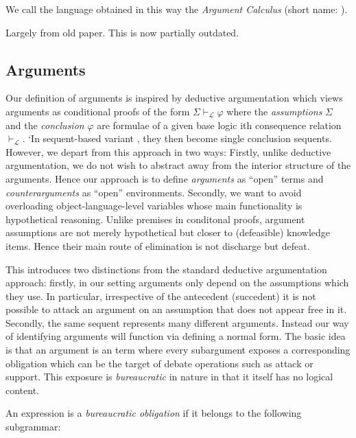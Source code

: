 \documentclass{article}
\begin{document}
We call the language obtained in this way the \emph{Argument Calculus} (short name: \AC).


\begin{oldpart}{Largely from old paper. This is now partially outdated.}

  \subsection{Arguments}

  Our definition of arguments is inspired by deductive argumentation \cite{besnard-review-argum} which views arguments as conditional proofs of the form $\Sigma \vdash_{\mathcal{L}} \varphi$ where the \emph{assumptions} $\Sigma$ and the \emph{conclusion} $\varphi$ are formulae of a given base logic ith consequence relation $\vdash_{\mathcal{L}}$.
  `In sequent-based variant \cite{TODO}, they then become single conclusion sequents.
  However, we depart from this approach in two ways:
  Firstly, unlike deductive argumentation, we do not wish to abstract away from the interior structure of the arguments.
  Hence our approach is to define \emph{arguments} as ``open'' terms and \emph{counterarguments} as ``open'' environments.
  Secondly, we want to avoid overloading object-language-level variables whose main functionality is hypothetical reasoning.
  Unlike premises in conditonal proofs, argument assumptions are not merely hypothetical but closer to (defeasible) knowledge items.
  Hence their main route of elimination is not discharge but defeat.

  This introduces two distinctions from the standard deductive argumentation approach: firstly, in our setting arguments only depend on the assumptions which they use.
  In particular, irrespective of the antecedent (succedent) it is not possible to attack an argument on an assumption that does not appear free in it.
  Secondly, the same sequent represents many different arguments.
  Instead our way of identifying arguments will function via defining a normal form.
  The basic idea is that an argument is an \AC term where every subargument exposes a corresponding obligation which can be the target of debate operations such as attack or support.
  This exposure is \emph{bureaucratic} in nature in that it itself has no logical content.

  \begin{definition}
    An \AC expression is a \emph{bureaucratic obligation} if it belongs to the following subgrammar:
    

\end{definition}
\end{oldpart}
\end{document}
